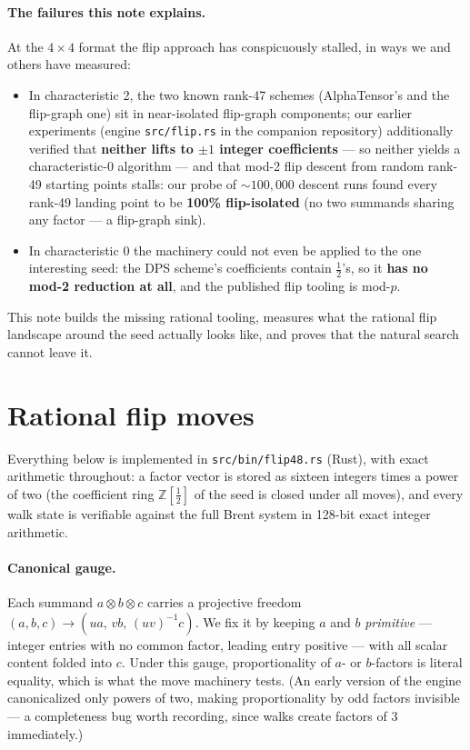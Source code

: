 \documentclass[10pt]{article}
\begin{document}
\paragraph{The failures this note explains.}
At the $4\times4$ format the flip approach has conspicuously stalled,
in ways we and others have measured:
\begin{itemize}
\item In characteristic 2, the two known rank-47 schemes
  (AlphaTensor's and the flip-graph one) sit in near-isolated
  flip-graph components; our earlier experiments (engine
  \texttt{src/flip.rs} in the companion repository) additionally
  verified that \textbf{neither lifts to $\pm1$ integer coefficients}
  --- so neither yields a characteristic-0 algorithm --- and that
  mod-2 flip descent from random rank-49 starting points stalls: our
  probe of ${\sim}100{,}000$ descent runs found every rank-49 landing
  point to be \textbf{100\% flip-isolated} (no two summands sharing
  any factor --- a flip-graph sink).
\item In characteristic 0 the machinery could not even be applied to
  the one interesting seed: the DPS scheme's coefficients contain
  $\tfrac12$'s, so it \textbf{has no mod-2 reduction at all}, and the
  published flip tooling is mod-$p$.
\end{itemize}
This note builds the missing rational tooling, measures what the
rational flip landscape around the seed actually looks like, and
proves that the natural search cannot leave it.

\section{Rational flip moves}\label{sec:moves}

Everything below is implemented in \texttt{src/bin/flip48.rs} (Rust),
with exact arithmetic throughout: a factor vector is stored as sixteen
integers times a power of two (the coefficient ring
$\mathbb{Z}[\tfrac12]$ of the seed is closed under all moves), and
every walk state is verifiable against the full Brent system in
128-bit exact integer arithmetic.

\paragraph{Canonical gauge.}
Each summand $a\otimes b\otimes c$ carries a projective freedom
$(a,b,c)\to(ua,\,vb,\,(uv)^{-1}c)$. We fix it by keeping $a$ and $b$
\emph{primitive} --- integer entries with no common factor, leading
entry positive --- with all scalar content folded into $c$. Under
this gauge, proportionality of $a$- or $b$-factors is literal
equality, which is what the move machinery tests. (An early version
of the engine canonicalized only powers of two, making
proportionality by odd factors invisible --- a completeness bug worth
recording, since walks create factors of 3 immediately.)
\end{document}
